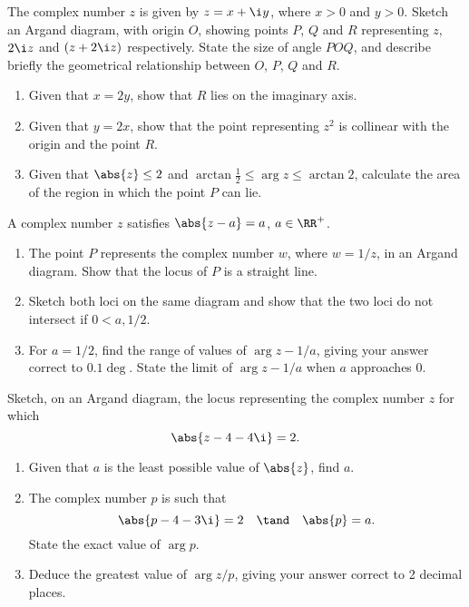 \begin{problem}
    The complex number $z$ is given by $z = x + \i y$, where $x > 0$ and $y > 0$. Sketch an Argand diagram, with origin $O$, showing points $P$, $Q$ and $R$ representing $z$, $2\i z$ and $(z + 2\i z)$ respectively. State the size of angle $POQ$, and describe briefly the geometrical relationship between $O$, $P$, $Q$ and $R$.

    \begin{enumerate}
        \item Given that $x = 2y$, show that $R$ lies on the imaginary axis.
        \item Given that $y = 2x$, show that the point representing $z^2$ is collinear with the origin and the point $R$.
        \item Given that $\abs{z} \leq 2$ and $\arctan \frac12 \leq \arg z \leq \arctan 2$, calculate the area of the region in which the point $P$ can lie.
    \end{enumerate}
\end{problem}

\begin{problem}
    A complex number $z$ satisfies $\abs{z - a} = a$, $a \in \RR^+$.

    \begin{enumerate}
        \item The point $P$ represents the complex number $w$, where $w = 1/z$, in an Argand diagram. Show that the locus of $P$ is a straight line.
        \item Sketch both loci on the same diagram and show that the two loci do not intersect if $0 < a , 1/2$.
        \item For $a = 1/2$, find the range of values of $\arg{z - 1/a}$, giving your answer correct to $0.1\deg$. State the limit of $\arg{z - 1/a}$ when $a$ approaches 0.
    \end{enumerate}
\end{problem}

\begin{problem}
    Sketch, on an Argand diagram, the locus representing the complex number $z$ for which \[\abs{z - 4 - 4\i} = 2.\]

    \begin{enumerate}
        \item Given that $a$ is the least possible value of $\abs{z}$, find $a$.
        \item The complex number $p$ is such that \[\abs{p - 4 - 3\i} = 2 \quad \tand \quad \abs{p} = a.\] State the exact value of $\arg p$.
        \item Deduce the greatest value of $\arg{z/p}$, giving your answer correct to 2 decimal places.
    \end{enumerate}
\end{problem}

